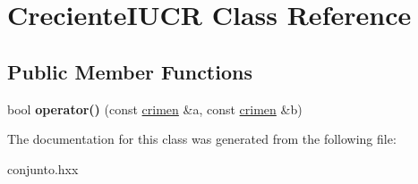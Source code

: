 \hypertarget{classCrecienteIUCR}{}\section{Creciente\+I\+U\+C\+R Class Reference}
\label{classCrecienteIUCR}
\subsection*{Public Member Functions}
\begin{DoxyCompactItemize}
\item 
\hypertarget{classCrecienteIUCR_a61f4c690a2a3475525079e97967661ce}{}bool {\bfseries operator()} (const \hyperlink{classcrimen}{crimen} \&a, const \hyperlink{classcrimen}{crimen} \&b)\label{classCrecienteIUCR_a61f4c690a2a3475525079e97967661ce}

\end{DoxyCompactItemize}


The documentation for this class was generated from the following file\+:\begin{DoxyCompactItemize}
\item 
conjunto.\+hxx\end{DoxyCompactItemize}
